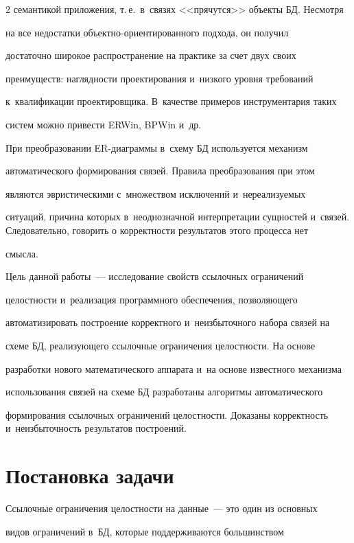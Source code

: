 \begin{multicols}{2}
семантикой приложения, т.\,е.\ в~связях <<прячутся>> объекты БД. Несмотря

на все недостатки объ\-ект\-но-ори\-ен\-ти\-ро\-ван\-но\-го подхода, он получил

достаточно широкое распространение на практике за счет двух своих

преимуществ: наглядности проектирования и~низкого уровня требований 

к~квалификации проектировщика. В~качестве примеров инструментария таких

систем можно привести ERWin, BPWin и~др.



  При преобразовании ER-диа\-грам\-мы в~схему БД используется механизм

автоматического формирования связей. Правила преобразования при этом

являются эвристическими с~множеством исключений и~нереализуемых

ситуаций, причина которых в~неоднозначной интерпретации сущностей и~связей. Следовательно, говорить о корректности результатов этого процесса нет

смысла.



  Цель данной работы~--- исследование свойств ссылочных ограничений

целостности и~реализация программного обеспечения, позволяющего

автоматизировать построение корректного и~неизбыточного набора связей на

схеме БД, реализующего ссылочные ограничения целостности. На основе

разработки нового математического аппарата и~на основе известного механизма

использования связей на схеме БД разработаны алгоритмы автоматического

формирования ссылочных ограничений целостности. Доказаны корректность и~неизбыточность результатов построений.



\section{Постановка задачи}



  Ссылочные ограничения целостности на данные~--- это один из основных

видов ограничений в~БД, которые поддерживаются большинством


\end{multicols}
